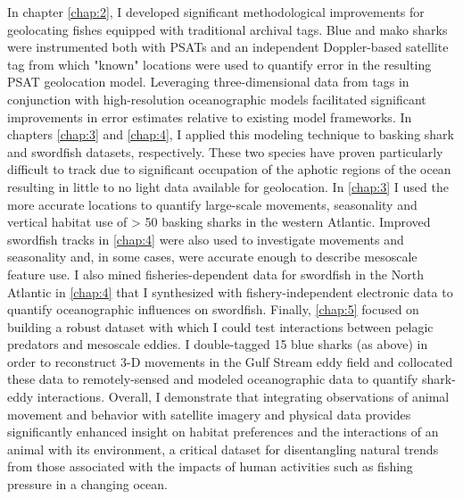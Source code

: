 In chapter \cref{chap:2}, I developed significant methodological improvements for geolocating fishes equipped with traditional archival tags. Blue and mako sharks were instrumented both with PSATs and an independent Doppler-based satellite tag from which "known" locations were used to quantify error in the resulting PSAT geolocation model. Leveraging three-dimensional data from tags in conjunction with high-resolution oceanographic models facilitated significant improvements in error estimates relative to existing model frameworks. In chapters \cref{chap:3} and \cref{chap:4}, I applied this modeling technique to basking shark and swordfish datasets, respectively. These two species have proven particularly difficult to track due to significant occupation of the aphotic regions of the ocean resulting in little to no light data available for geolocation. In \cref{chap:3} I used the more accurate locations to quantify large-scale movements, seasonality and vertical habitat use of > 50 basking sharks in the western Atlantic. Improved swordfish tracks in \cref{chap:4} were also used to investigate movements and seasonality and, in some cases, were accurate enough to describe mesoscale feature use. I also mined fisheries-dependent data for swordfish in the North Atlantic in \cref{chap:4} that I synthesized with fishery-independent electronic data to quantify oceanographic influences on swordfish. Finally, \cref{chap:5} focused on building a robust dataset with which I could test interactions between pelagic predators and mesoscale eddies. I double-tagged 15 blue sharks (as above) in order to reconstruct 3-D movements in the Gulf Stream eddy field and collocated these data to remotely-sensed and modeled oceanographic data to quantify shark-eddy interactions. Overall, I demonstrate that integrating observations of animal movement and behavior with satellite imagery and physical data provides significantly enhanced insight on habitat preferences and the interactions of an animal with its environment, a critical dataset for disentangling natural trends from those associated with the impacts of human activities such as fishing pressure in a changing ocean.


